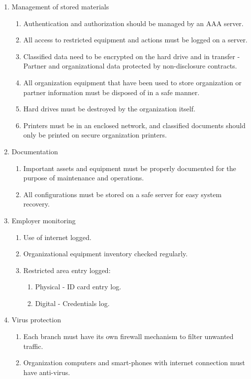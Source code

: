 \begin{enumerate}
  \item Management of stored materials
  \begin{enumerate}
    \item Authentication and authorization should be managed by an AAA server.
    \item All access to restricted equipment and actions must be logged on a server.
    \item Classified data need to be encrypted on the hard drive and in transfer - Partner and organizational data protected by non-disclosure contracts.
    \item All organization equipment that have been used to store organization or partner information must be disposed of in a safe manner.
    \item Hard drives must be destroyed by the organization itself.
    \item Printers must be in an enclosed network, and classified documents should only be printed on secure organization printers.
  \end{enumerate}
  \item Documentation
  \begin{enumerate}
      \item Important assets and equipment must be properly documented for the purpose of maintenance and operations.
      \item All configurations must be stored on a safe server for easy system recovery.
  \end{enumerate}
  \item Employer monitoring
  \begin{enumerate}
    \item Use of internet logged.
    \item Organizational equipment inventory checked regularly.
    \item Restricted area entry logged:
    \begin{enumerate}
      \item Physical - ID card entry log.
      \item Digital - Credentials log.
    \end{enumerate}
  \end{enumerate}
  \item Virus protection
  \begin{enumerate}
    \item Each branch must have its own firewall mechanism to filter unwanted traffic.
    \item Organization computers and smart-phones with internet connection must have anti-virus.

\end{enumerate}
\end{enumerate}
